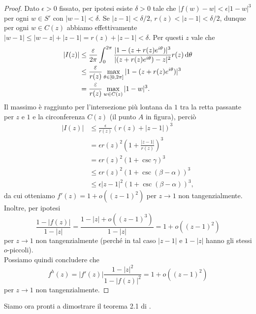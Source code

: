 \begin{proof}
  Dato $\epsilon>0$ fissato, per ipotesi esiste $\delta>0$ tale che $|f(w)-w|<\epsilon|1-w|^3$ per ogni $w \in S'$ con $|w-1|<\delta$. Se $|z-1|<\delta/2$, $r(z)<|z-1|<\delta/2$, dunque per ogni $w \in C(z)$ abbiamo effettivamente $|w-1| \le |w-z|+|z-1|=r(z)+|z-1|<\delta$. Per questi $z$ vale che
  \begin{align*}
    |I(z)| & \le \frac{\varepsilon}{2\pi} \int_0^{2\pi} \frac{|1-(z+r(z)e^{i\theta})|^3}{|(z+r(z)e^{i\theta})-z|^2}r(z)\mathop{}\!\mathrm{d}\theta \\
    & \le \frac{\varepsilon}{r(z)}\max_{\theta \in [0,2\pi]} |1-(z+r(z)e^{i\theta})|^3 \\
    & =\frac{\varepsilon}{r(z)}\max_{w \in C(z)}|1-w|^3.
  \end{align*}
  Il massimo è raggiunto per l'intersezione più lontana da $1$ tra la retta passante per $z$ e $1$ e la circonferenza $C(z)$ (il punto $A$ in figura), perciò
  \begin{align*}
    |I(z)| & \le \frac{\epsilon}{r(z)}(r(z)+|z-1|)^3 \\
    & =\epsilon r(z)^2\left(1+\frac{|z-1|}{r(z)}\right)^3 \\
    & =\epsilon r(z)^2(1+\csc\gamma)^3 \\
    & \le \epsilon r(z)^2(1+\csc(\beta-\alpha))^3 \\
    & \le \epsilon |z-1|^2(1+\csc(\beta-\alpha))^3,
  \end{align*}
  da cui otteniamo $f'(z)=1+o((z-1)^2)$ per $z \longrightarrow 1$ non tangenzialmente. Inoltre, per ipotesi
  $$\frac{1-|f(z)|}{1-|z|}=\frac{1-|z|+o((z-1)^3)}{1-|z|}=1+o((z-1)^2)$$
  per $z \longrightarrow 1$ non tangenzialmente (perché in tal caso $|z-1|$ e $1-|z|$ hanno gli stessi $o$-piccoli). \\
  Possiamo quindi concludere che
  $$f^h(z)=|f'(z)|\frac{1-|z|^2}{1-|f(z)|^2}=1+o((z-1)^2)$$
  per $z \longrightarrow 1$ non tangenzialmente.
\end{proof}

Siamo ora pronti a dimostrare il teorema 2.1 di \cite{BK}.

